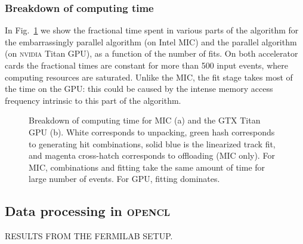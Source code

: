 \documentclass[journal]{IEEEtran}
\begin{document}
\subsubsection{Breakdown of computing time}
In Fig.~\ref{fig:breakdown} we show the fractional time spent in
various parts of the algorithm for the embarrassingly parallel algorithm 
(on Intel MIC) and the parallel algorithm (on \textsc{nvidia} Titan GPU), as a 
function of the number of fits. On both accelerator cards the fractional times
are constant for more than 500 input events, where computing resources are saturated. 
Unlike the MIC, the fit stage takes most of the time on the GPU: this 
could be caused by the intense memory access frequency intrinsic to
this part of the algorithm.  
\begin{figure}[!t]
\centering
{}
\caption{Breakdown of computing time for MIC (a) and the GTX Titan GPU
  (b). White corresponds to unpacking, green hash corresponds to
  generating hit combinations, solid blue is the linearized track fit,
  and magenta cross-hatch corresponds to offloading (MIC only). For
  MIC, combinations and fitting take the same amount of time for large
  number of events. For GPU, fitting dominates. }
\label{fig:breakdown}
\end{figure}

\subsection{Data processing in \textsc{opencl}}
RESULTS FROM THE FERMILAB SETUP.
\end{document}
